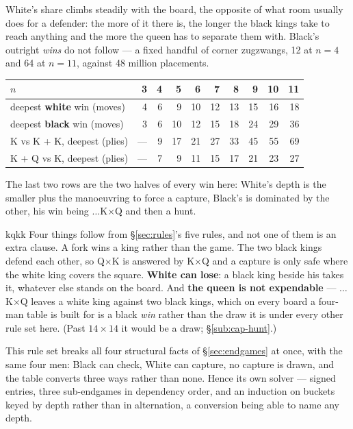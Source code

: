 \documentclass[10pt]{article}
\begin{document}
\noindent
White's share climbs steadily with the board, the opposite of what room usually
does for a defender: the more of it there is, the longer the black kings take
to reach anything and the more the queen has to separate them with. Black's
outright \emph{wins} do not follow --- a fixed handful of corner zugzwangs, 12
at $n=4$ and 64 at $n=11$, against 48 million placements.

\begin{center}\small
\begin{tabular}{@{}lrrrrrrrrr@{}}
\toprule
$n$ & 3 & 4 & 5 & 6 & 7 & 8 & 9 & 10 & 11 \\
\midrule
deepest \textbf{white} win (moves) & 4 & 6 & 9 & 10 & 12 & 13 & 15 & 16 & 18 \\
deepest \textbf{black} win (moves) & 3 & 6 & 10 & 12 & 15 & 18 & 24 & 29 & 36 \\
\midrule
K vs K + K, deepest (plies) & --- & 9 & 17 & 21 & 27 & 33 & 45 & 55 & 69 \\
K + Q vs K, deepest (plies) & --- & 7 & 9 & 11 & 15 & 17 & 21 & 23 & 27 \\
\bottomrule
\end{tabular}
\end{center}

\noindent
The last two rows are the two halves of every win here: White's depth is the
smaller plus the manoeuvring to force a capture, Black's is dominated by the
other, his win being $\ldots$K$\times$Q and then a hunt.

\begin{result}[title={What the rules change about this endgame}]{kqkk}
Four things follow from \S\ref{sec:rules}'s five rules, and not one of them is
an extra clause. A fork wins a king rather than the game. The two black kings
defend each other, so Q$\times$K is answered by K$\times$Q and a capture is
only safe where the white king covers the square. \textbf{White can lose}: a
black king beside his takes it, whatever else stands on the board. And
\textbf{the queen is not expendable} --- $\ldots$K$\times$Q leaves a white king
against two black kings, which on every board a four-man table is built for is
a black \emph{win} rather than the draw it is under every other rule set here.
(Past $14\times14$ it would be a draw; \S\ref{sub:cap-hunt}.)

\smallskip
This rule set breaks all four structural facts of \S\ref{sec:endgames} at once,
with the same four men: Black can check, White can capture, no capture is
drawn, and the table converts three ways rather than none. Hence its own solver
--- signed entries, three sub-endgames in dependency order, and an induction on
buckets keyed by depth rather than in alternation, a conversion being able to
name any depth.
\end{result}
\end{document}

